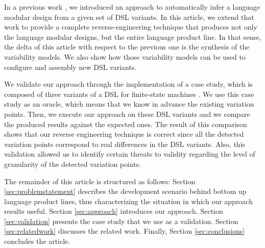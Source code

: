 In a previous work \cite{MendezAcuna:2016}, we introduced an approach to automatically infer a language modular design from a given set of DSL variants. In this article, we extend that work to provide a complete reverse-engineering technique that produces not only the language modular designs, but the entire language product line. In that sense, the delta of this article with respect to the previous one is the synthesis of the variability models. We also show how those variability models can be used to configure and assembly new DSL variants.

We validate our approach through the implementation of a case study, which is composed of three variants of a DSL for finite-state machines \cite{Crane:2007}. We use this case study as an oracle, which means that we know in advance the existing variation points. Then, we execute our approach on these DSL variants and we compare the produced results against the expected ones. The result of this comparison shows that our reverse engineering technique is correct since all the detected variation points correspond to real differences in the DSL variants. Also, this validation allowed us to identify certain threats to validity regarding the level of granularity of the detected variation points. 

The remainder of this article is structured as follows: Section \ref{sec:problemstatement} describes the development scenario behind bottom up language product lines, thus characterizing the situation in which our approach results useful. Section \ref{sec:approach} introduces our approach. Section \ref{sec:validation} presents the case study that we use as a validation. Section \ref{sec:relatedwork} discusses the related work. Finally, Section \ref{sec:conclusions} concludes the article. 
